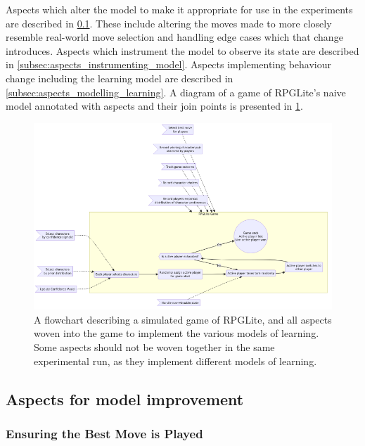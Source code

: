Aspects which alter the model to make it appropriate for use in the experiments
are described in \cref{subsec:aspects_improving_model}. These include altering
the moves made to more closely resemble real-world move selection and handling
edge cases which that change introduces. Aspects which instrument the model to
observe its state are described in \cref{subsec:aspects_instrumenting_model}.
Aspects implementing behaviour change including the learning model are described
in \cref{subsec:aspects_modelling_learning}. A diagram of a game of RPGLite's
naive model annotated with aspects and their join points is presented in
\cref{fig:all_aspects_applied}.

\begin{figure}[h]
  \centering
  \includegraphics[width=\columnwidth]{60_optimisation_with_aspects/diagrams/aspect_applied_model.png}
  \caption{A flowchart describing a simulated game of RPGLite, and all aspects woven into the game to implement the various models of learning. Some aspects should not be woven together in the same experimental run, as they implement different models of learning.}
  \label{fig:all_aspects_applied}
\end{figure}


\subsection{Aspects for model improvement}\label{subsec:aspects_improving_model}

\subsubsection{Ensuring the Best Move is Played}\label{aspect_to_ensure_best_move}

